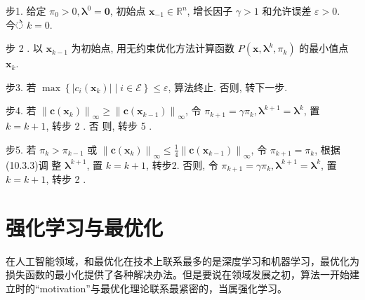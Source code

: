 步1. 给定 $\pi_{0}>0, \boldsymbol{\lambda}^{0}=\mathbf{0}$, 初始点 $\boldsymbol{x}_{-1} \in \mathbb{R}^{n}$, 增长因子 $\gamma>1$ 和允许误差 $\varepsilon>0$. 今े $k=0$.

步 2 . 以 $\boldsymbol{x}_{k-1}$ 为初始点, 用无约束优化方法计算函数 $P\left(\boldsymbol{x}, \boldsymbol{\lambda}^{k}, \pi_{k}\right)$ 的最小值点 $\boldsymbol{x}_{k}$.

步3. 若 $\max \left\{\left|c_{i}\left(\boldsymbol{x}_{k}\right)\right| \mid i \in \mathcal{E}\right\} \leqslant \varepsilon$, 算法终止. 否则, 转下一步.

步4. 若 $\left\|\boldsymbol{c}\left(\boldsymbol{x}_{k}\right)\right\|_{\infty} \geqslant\left\|\boldsymbol{c}\left(\boldsymbol{x}_{k-1}\right)\right\|_{\infty}$, 令 $\pi_{k+1}=\gamma \pi_{k}, \boldsymbol{\lambda}^{k+1}=\boldsymbol{\lambda}^{k}$, 置 $k=k+1$, 转步 2 . 否 则, 转步 5 .

步5. 若 $\pi_{k}>\pi_{k-1}$ 或 $\left\|\boldsymbol{c}\left(\boldsymbol{x}_{k}\right)\right\|_{\infty} \leqslant \frac{1}{4}\left\|\boldsymbol{c}\left(\boldsymbol{x}_{k-1}\right)\right\|_{\infty}$, 令 $\pi_{k+1}=\pi_{k}$, 根据 (10.3.3)调 整 $\boldsymbol{\lambda}^{k+1}$, 置 $k=k+1$, 转步2. 否则, 令 $\pi_{k+1}=\gamma \pi_{k}, \boldsymbol{\lambda}^{k+1}=\boldsymbol{\lambda}^{k}$, 置 $k=k+1$, 转步 2 .






\chapter{强化学习与最优化}
在人工智能领域，和最优化在技术上联系最多的是深度学习和机器学习，最优化为损失函数的最小化提供了各种解决办法。但是要说在领域发展之初，算法一开始建立时的“motivation”与最优化理论联系最紧密的，当属强化学习。

